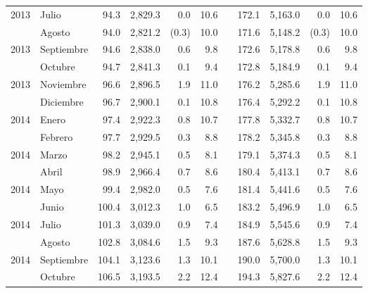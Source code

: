 \begin{center}
\begin{longtable}{llrrrrrrrrr}
		\multicolumn{1}{l}{	2013	}&	Julio	&	 94.3 	&	 2,829.3 	&	 0.0 	&	 10.6 	&  &	 172.1 	&	 5,163.0 	&	 0.0 	&	 10.6 	\\
		\rowcolor{color1!5!white}\multicolumn{1}{l}{	2013	}&	Agosto	&	 94.0 	&	 2,821.2 	&	 (0.3)	&	 10.0 	&  &	 171.6 	&	 5,148.2 	&	 (0.3)	&	 10.0 	\\
		\multicolumn{1}{l}{	2013	}&	Septiembre	&	 94.6 	&	 2,838.0 	&	 0.6 	&	 9.8 	&  &	 172.6 	&	 5,178.8 	&	 0.6 	&	 9.8 	\\
		\rowcolor{color1!5!white}\multicolumn{1}{l}{	2013	}&	Octubre	&	 94.7 	&	 2,841.3 	&	 0.1 	&	 9.4 	&  &	 172.8 	&	 5,184.9 	&	 0.1 	&	 9.4 	\\
		\multicolumn{1}{l}{	2013	}&	Noviembre	&	 96.6 	&	 2,896.5 	&	 1.9 	&	 11.0 	&  &	 176.2 	&	 5,285.6 	&	 1.9 	&	 11.0 	\\
		\rowcolor{color1!5!white}\multicolumn{1}{l}{	2013	}&	Diciembre	&	 96.7 	&	 2,900.1 	&	 0.1 	&	 10.8 	&  &	 176.4 	&	 5,292.2 	&	 0.1 	&	 10.8 	\\
		\multicolumn{1}{l}{	2014	}&	Enero	&	 97.4 	&	 2,922.3 	&	 0.8 	&	 10.7 	&  &	 177.8 	&	 5,332.7 	&	 0.8 	&	 10.7 	\\
		\rowcolor{color1!5!white}\multicolumn{1}{l}{	2014	}&	Febrero	&	 97.7 	&	 2,929.5 	&	 0.3 	&	 8.8 	&  &	 178.2 	&	 5,345.8 	&	 0.3 	&	 8.8 	\\
		\multicolumn{1}{l}{	2014	}&	Marzo	&	 98.2 	&	 2,945.1 	&	 0.5 	&	 8.1 	&  &	 179.1 	&	 5,374.3 	&	 0.5 	&	 8.1 	\\
		\rowcolor{color1!5!white}\multicolumn{1}{l}{	2014	}&	Abril	&	 98.9 	&	 2,966.4 	&	 0.7 	&	 8.6 	&  &	 180.4 	&	 5,413.1 	&	 0.7 	&	 8.6 	\\
		\multicolumn{1}{l}{	2014	}&	Mayo	&	 99.4 	&	 2,982.0 	&	 0.5 	&	 7.6 	&  &	 181.4 	&	 5,441.6 	&	 0.5 	&	 7.6 	\\
		\rowcolor{color1!5!white}\multicolumn{1}{l}{	2014	}&	Junio	&	 100.4 	&	 3,012.3 	&	 1.0 	&	 6.5 	&  &	 183.2 	&	 5,496.9 	&	 1.0 	&	 6.5 	\\
		\multicolumn{1}{l}{	2014	}&	Julio	&	 101.3 	&	 3,039.0 	&	 0.9 	&	 7.4 	&  &	 184.9 	&	 5,545.6 	&	 0.9 	&	 7.4 	\\
		\rowcolor{color1!5!white}\multicolumn{1}{l}{	2014	}&	Agosto	&	 102.8 	&	 3,084.6 	&	 1.5 	&	 9.3 	&  &	 187.6 	&	 5,628.8 	&	 1.5 	&	 9.3 	\\
		\multicolumn{1}{l}{	2014	}&	Septiembre	&	 104.1 	&	 3,123.6 	&	 1.3 	&	 10.1 	&  &	 190.0 	&	 5,700.0 	&	 1.3 	&	 10.1 	\\
		\rowcolor{color1!5!white}\multicolumn{1}{l}{	2014	}&	Octubre	&	 106.5 	&	 3,193.5 	&	 2.2 	&	 12.4 	&  &	 194.3 	&	 5,827.6 	&	 2.2 	&	 12.4 	\\

\end{longtable}
\end{center}

